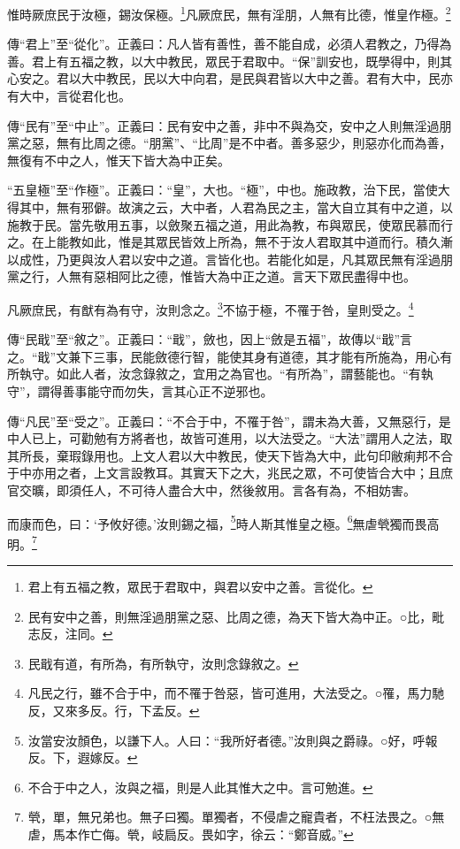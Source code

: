 惟時厥庶民于汝極，錫汝保極。\footnote{君上有五福之教，眾民于君取中，與君以安中之善。言從化。}凡厥庶民，無有淫朋，人無有比德，惟皇作極。\footnote{民有安中之善，則無淫過朋黨之惡、比周之德，為天下皆大為中正。○比，毗志反，注同。}

{\noindent\zhuan{}\fzbyks 傳“君上”至“從化”。正義曰：凡人皆有善性，善不能自成，必須人君教之，乃得為善。君上有五福之教，以大中教民，眾民于君取中。“保”訓安也，既學得中，則其心安之。君以大中教民，民以大中向君，是民與君皆以大中之善。君有大中，民亦有大中，言從君化也。 \par}

{\noindent\zhuan{}\fzbyks 傳“民有”至“中止”。正義曰：民有安中之善，非中不與為交，安中之人則無淫過朋黨之惡，無有比周之德。“朋黨”、“比周”是不中者。善多惡少，則惡亦化而為善，無復有不中之人，惟天下皆大為中正矣。 \par}

{\noindent\shu{}\fzkt “五皇極”至“作極”。正義曰：“皇”，大也。“極”，中也。施政教，治下民，當使大得其中，無有邪僻。故演之云，大中者，人君為民之主，當大自立其有中之道，以施教于民。當先敬用五事，以斂聚五福之道，用此為教，布與眾民，使眾民慕而行之。在上能教如此，惟是其眾民皆效上所為，無不于汝人君取其中道而行。積久漸以成性，乃更與汝人君以安中之道。言皆化也。若能化如是，凡其眾民無有淫過朋黨之行，人無有惡相阿比之德，惟皆大為中正之道。言天下眾民盡得中也。 \par}

凡厥庶民，有猷有為有守，汝則念之。\footnote{民戢有道，有所為，有所執守，汝則念錄敘之。}不協于極，不罹于咎，皇則受之。\footnote{凡民之行，雖不合于中，而不罹于咎惡，皆可進用，大法受之。○罹，馬力馳反，又來多反。行，下孟反。}


{\noindent\zhuan{}\fzbyks 傳“民戢”至“敘之”。正義曰：“戢”，斂也，因上“斂是五福”，故傳以“戢”言之。“戢”文兼下三事，民能斂德行智，能使其身有道德，其才能有所施為，用心有所執守。如此人者，汝念錄敘之，宜用之為官也。“有所為”，謂藝能也。“有執守”，謂得善事能守而勿失，言其心正不逆邪也。 \par}

{\noindent\zhuan{}\fzbyks 傳“凡民”至“受之”。正義曰：“不合于中，不罹于咎”，謂未為大善，又無惡行，是中人已上，可勸勉有方將者也，故皆可進用，以大法受之。“大法”謂用人之法，取其所長，棄瑕錄用也。上文人君以大中教民，使天下皆為大中，此句印敝痢邦不合于中亦用之者，上文言設教耳。其實天下之大，兆民之眾，不可使皆合大中；且庶官交曠，即須任人，不可待人盡合大中，然後敘用。言各有為，不相妨害。 \par}

而康而色，曰：‘予攸好德。’汝則錫之福，\footnote{汝當安汝顏色，以謙下人。人曰：“我所好者德。”汝則與之爵祿。○好，呼報反。下，遐嫁反。}時人斯其惟皇之極。\footnote{不合于中之人，汝與之福，則是人此其惟大之中。言可勉進。}無虐煢獨而畏高明。\footnote{煢，單，無兄弟也。無子曰獨。單獨者，不侵虐之寵貴者，不枉法畏之。○無虐，馬本作亡侮。煢，岐扃反。畏如字，徐云：“鄭音威。”}

